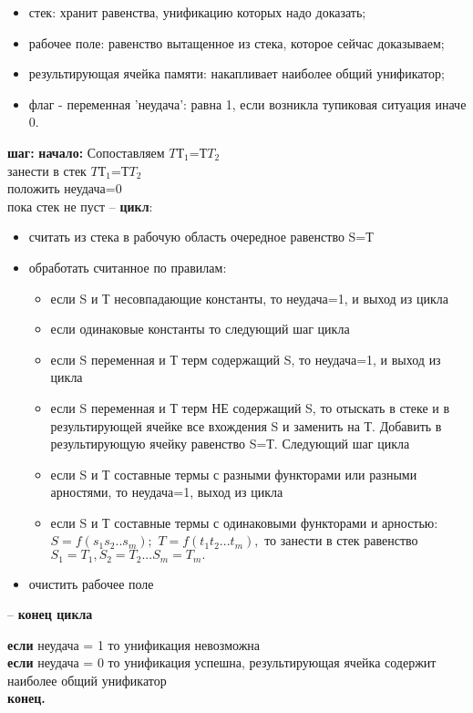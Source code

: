 \begin{enumerate}
\begin{itemize}
    
    \item стек: хранит равенства, унификацию которых надо доказать;
    \item рабочее поле:  равенство вытащенное из стека, которое сейчас доказываем;
    \item результирующая ячейка памяти: накапливает наиболее общий унификатор;
    \item флаг - переменная 'неудача':  равна 1, если возникла тупиковая ситуация иначе 0.
	\end{itemize}
    \textbf{шаг:}
    \textbf{начало:} Сопоставляем $TТ_1$=$ТT_2$\\
    занести в стек $TТ_1$=$ТT_2$\\
    положить неудача=0\\
    пока стек не пуст – \textbf{цикл}:
    \begin{itemize}
    \item	считать из стека в рабочую область очередное равенство S=Т
    \item	обработать считанное по правилам:
    \begin{itemize}
    \item	если S и Т несовпадающие константы,			то неудача=1, и выход из цикла
    \item	если одинаковые константы					то следующий шаг цикла
    \item	если S переменная и Т терм содержащий S,		то неудача=1, и выход из цикла
    \item	если S переменная и Т терм НЕ содержащий S,	то отыскать в стеке и в результирующей ячейке все вхождения S и заменить на Т. Добавить в результирующую ячейку равенство S=Т.  Следующий шаг цикла
    \item	если S и Т составные термы с разными функторами или разными арностями, то неудача=1, выход из цикла
    \item	если S и Т составные термы с одинаковыми функторами и арностью: $S=f(s_1 s_2 .. s_m);$   $T=f(t_1 t_2 ... t_m),$  то занести в стек равенство $S_1=T_1, S_2=T_2 ... S_m=T_m.$
\end{itemize}
    \item	очистить рабочее поле
	\end{itemize}
    –  \textbf{конец цикла}
    
    \textbf{если} неудача = 1 то унификация невозможна
    \\ \textbf{если} неудача = 0 то унификация успешна, результирующая ячейка содержит наиболее общий унификатор
    \\ \textbf{конец.}
    

\end{enumerate}
